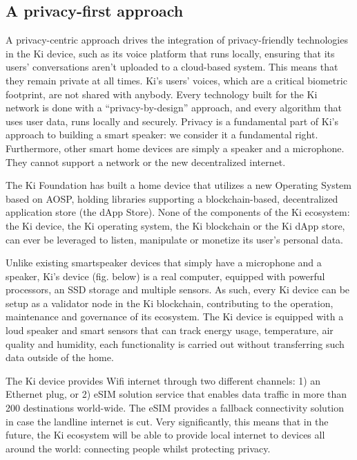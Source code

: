 \subsection{A privacy-first approach}
\label{sec:kideviceprivacy}
A privacy-centric approach drives the integration of privacy-friendly technologies in the Ki device, such as its voice platform that runs locally, ensuring that its users' conversations aren't uploaded to a cloud-based system. This means that they remain private at all times. Ki's users' voices, which are a critical biometric footprint, are not shared with anybody. Every technology built for the Ki network is done with a “privacy-by-design” approach, and every algorithm that uses user data, runs locally and securely. Privacy is a fundamental part of Ki's approach to building a smart speaker: we consider it a fundamental right. Furthermore, other smart home devices are simply a speaker and a microphone. They cannot support a network or the new decentralized internet.


The Ki Foundation has built a home device that utilizes a new Operating System based on AOSP, holding libraries supporting a blockchain-based, decentralized application store (the dApp Store). None of the components of the Ki ecosystem: the Ki device, the Ki operating system, the Ki blockchain or the Ki dApp store, can ever be leveraged to listen, manipulate or monetize its user's personal data.

Unlike existing smartspeaker devices that simply have a microphone and a speaker, Ki's device (fig. below) is a real computer, equipped with powerful processors, an SSD storage and multiple sensors. As such, every Ki device can be setup as a validator node in the Ki blockchain, contributing to the operation, maintenance and governance of its ecosystem. The Ki device is equipped with a loud speaker and smart sensors that can track energy usage, temperature, air quality and humidity, each functionality is carried out without transferring such data outside of the home.

The Ki device provides Wifi internet through two different channels: 1) an Ethernet plug, or 2) eSIM solution service that enables data traffic in more than 200 destinations world-wide. The eSIM provides a fallback connectivity solution in case the landline internet is cut. Very significantly, this means that in the future, the Ki ecosystem will be able to provide local internet to devices all around the world: connecting people whilst protecting privacy.



